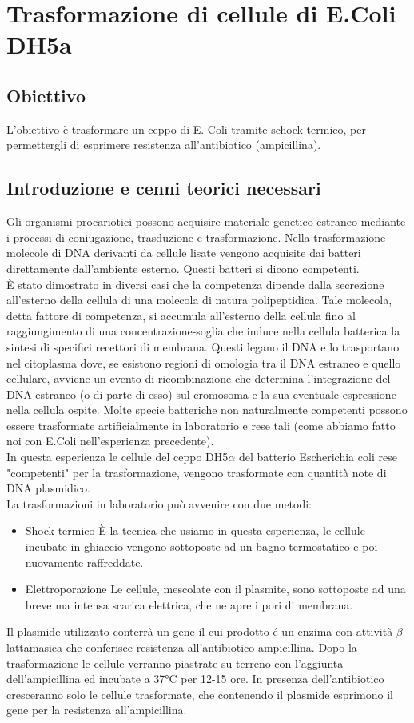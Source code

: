 \documentclass{extarticle}
\begin{document}
\newpage
\section{Trasformazione di cellule di E.Coli DH5a}
\subsection*{Obiettivo} L'obiettivo è trasformare un ceppo di E. Coli tramite schock termico, per permettergli di esprimere resistenza all'antibiotico (ampicillina).
\subsection*{Introduzione e cenni teorici necessari}Gli organismi procariotici possono acquisire materiale genetico estraneo mediante i processi di coniugazione, trasduzione e trasformazione. Nella trasformazione molecole di DNA derivanti da cellule lisate vengono acquisite dai batteri direttamente dall'ambiente esterno. Questi batteri si dicono competenti.\\
È stato dimostrato in diversi casi che la competenza dipende dalla secrezione all'esterno della cellula di una molecola di natura polipeptidica. Tale molecola, detta fattore di competenza, si accumula all'esterno della cellula fino al raggiungimento di una concentrazione-soglia che induce nella cellula batterica la sintesi di specifici recettori di membrana. Questi legano il DNA e lo trasportano nel citoplasma dove, se esistono regioni di omologia tra il DNA estraneo e quello cellulare, avviene un evento di ricombinazione che determina l'integrazione del DNA estraneo (o di parte di esso) sul cromosoma e la sua eventuale espressione nella cellula ospite. Molte specie batteriche non naturalmente competenti possono essere trasformate artificialmente in laboratorio e rese tali (come abbiamo fatto noi con E.Coli nell'esperienza precedente).\\
In questa esperienza le cellule del ceppo DH5$\alpha$ del batterio Escherichia coli rese "competenti" per la trasformazione, vengono trasformate con quantità note di DNA plasmidico.\\ La trasformazioni in laboratorio può avvenire con due metodi:
\begin{itemize}
    \item Shock termico 
    \subitem È la tecnica che usiamo in questa esperienza, le cellule incubate in ghiaccio vengono sottoposte ad un bagno termostatico e poi nuovamente raffreddate.
    \item Elettroporazione
    \subitem Le cellule, mescolate con il plasmite, sono sottoposte ad una breve ma intensa scarica elettrica, che ne apre i pori di membrana.
\end{itemize}
Il plasmide utilizzato conterrà un gene il cui prodotto é un enzima con attività $\beta$-lattamasica che conferisce resistenza all'antibiotico ampicillina. Dopo la trasformazione le cellule verranno piastrate su terreno con l'aggiunta dell'ampicillina ed incubate a 37°C per 12-15 ore. In presenza dell'antibiotico cresceranno solo le cellule trasformate, che contenendo il plasmide esprimono il gene per la resistenza all'ampicillina.
\end{document}

